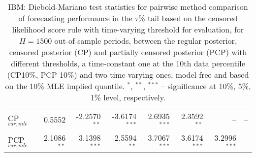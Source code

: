 {{\begin{table}
\begin{tabular}{l | rrrrrrr}
CP$_{var,mle}$ & 0.5552\phantom{$^{***}$} & -2.2570$^{**}$\phantom{$^{*}$} & -3.6174$^{***}$ & 2.6935$^{***}$ & 2.3592$^{**}$\phantom{$^{*}$} &    --\phantom{$^{***}$} &    --\phantom{$^{***}$}   \\ 
PCP$_{var,mle}$ & 2.1086$^{**}$\phantom{$^{*}$} & 3.1398$^{***}$ & -2.5594$^{**}$\phantom{$^{*}$} & 3.7067$^{***}$ & 3.6174$^{***}$ & 3.2996$^{***}$ &    --\phantom{$^{***}$}   \\ 
\hline  
\end{tabular}
 \caption{IBM: Diebold-Mariano test statistics for pairwise method comparison  of forecasting performance in the $\tau$\% tail based on  the censored likelihood score rule with time-varying threshold for evaluation,  for $H=1500$ out-of-sample periods,  between  the regular posterior, censored posterior (CP) and  partially censored posterior (PCP) with different thresholds,  a time-constant one at the 10th data percentile (CP10\%, PCP 10\%) and two time-varying ones, model-free and based on the 10\% MLE implied quantile. 
$^{*}$, $^{**}$, $^{***}$ -- significance at 10\%, 5\%, 1\% level, respectively.}
\label{tab:IBM_DMv}  
\end{table}
}}
